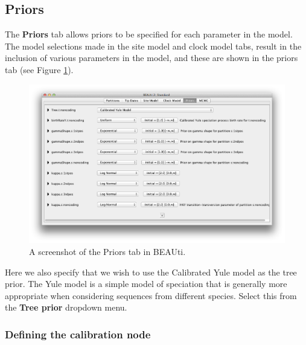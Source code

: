 \documentclass[11pt]{article}
\theoremstyle{plain}%
\theoremstyle{definition}
\theoremstyle{remark}
\begin{document}

\subsection{Priors }

The {\bf Priors} tab allows priors to be specified for each parameter in the
model. The model selections made in the site model and clock model tabs, result in the inclusion of various parameters
in the model, and these are shown in the priors tab (see Figure \ref{fig:BEAUti_Prior1}).

\begin{figure}
\includegraphics[width=\textwidth]{figures/BEAUti_Prior1}
\caption{A screenshot of the Priors tab in BEAUti. }
\label{fig:BEAUti_Prior1}
\end{figure}

Here we also specify that we wish to use the Calibrated Yule model \cite{Heled:2012fk}
as the tree prior. The Yule model is a simple model of
speciation that is generally more appropriate when considering sequences from
different species. %
Select this from the {\bf Tree prior} dropdown menu.


\subsubsection{Defining the calibration node}
\end{document}
